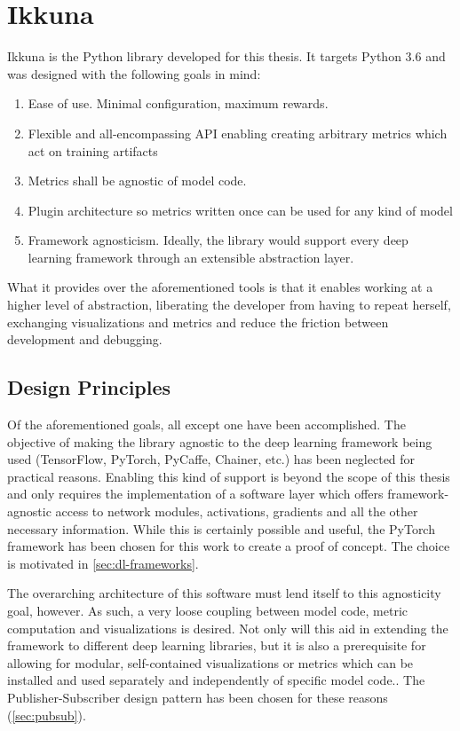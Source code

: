 \hypertarget{ikkuna}{%
\chapter{Ikkuna}\label{ikkuna}}

Ikkuna is the Python library developed for this thesis. It targets
Python 3.6 and was designed with the following goals in mind:

\begin{enumerate}
    \item
        Ease of use. Minimal configuration, maximum rewards.
    \item
        Flexible and all-encompassing API enabling creating arbitrary metrics
        which act on training artifacts
    \item
        Metrics shall be agnostic of model code.
    \item
        Plugin architecture so metrics written once can be used for any kind
        of model
    \item
        Framework agnosticism. Ideally, the library would support every deep
        learning framework through an extensible abstraction layer.
\end{enumerate}

What it provides over the aforementioned tools is that it enables
working at a higher level of abstraction, liberating the developer from
having to repeat herself, exchanging visualizations and metrics and
reduce the friction between development and debugging.

\hypertarget{design-principles}{%
\section{Design Principles}\label{design-principles}}

Of the aforementioned goals, all except one have been accomplished. The
objective of making the library agnostic to the deep learning framework
being used (TensorFlow, PyTorch, PyCaffe, Chainer, etc.) has been
neglected for practical reasons. Enabling this kind of support is beyond
the scope of this thesis and only requires the implementation of a
software layer which offers framework-agnostic access to network
modules, activations, gradients and all the other necessary information.
While this is certainly possible and useful, the PyTorch framework has
been chosen for this work to create a proof of concept. The choice is
motivated in \cref{sec:dl-frameworks}.

The overarching architecture of this software must lend itself to this
agnosticity goal, however. As such, a very loose coupling between model
code, metric computation and visualizations is desired. Not only will
this aid in extending the framework to different deep learning
libraries, but it is also a prerequisite for allowing for modular,
self-contained visualizations or metrics which can be installed and used
separately and independently of specific model code.. The
Publisher-Subscriber design pattern has been chosen for these reasons
(\cref{sec:pubsub}).

